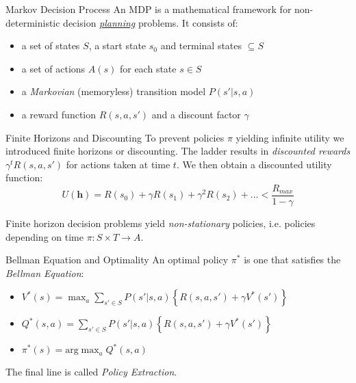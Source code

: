 \documentclass{cognito}
\begin{document}
\begin{note}{Markov Decision Process}
	An MDP is a mathematical framework for non-deterministic decision \hyperref[note:Planning vs. Learning]{\it planning} problems.
	It consists of:
	\begin{itemize}
		\item a set of states $S$, a start state $s_0$ and terminal states $\subseteq S$
		\item a set of actions $A(s)$ for each state $s \in S$
		\item a \emph{Markovian} (memoryless) transition model $P(s' | s, a)$
		\item a reward function $R(s,a,s')$ and a discount factor $\gamma$
	\end{itemize}
\end{note}

\begin{note}{Finite Horizons and Discounting}
	To prevent policies $\pi$ yielding infinite utility we introduced finite horizons or discounting.
	The ladder results in \emph{discounted rewards} $\gamma^t R(s, a, s')$ for actions taken at time $t$.
	We then obtain a discounted utility function:
	$$
		U(\mathbf{h}) = R(s_0) + \gamma R(s_1) + \gamma^2 R(s_2) + ... < \frac{R_{max}}{1 - \gamma}
	$$
	\begin{remark}
		Finite horizon decision problems yield \emph{non-stationary} policies, i.e.
		policies depending on time $\pi : S \times T \to A$.
	\end{remark}
	\vspace{-5pt}
\end{note}

\begin{note}{Bellman Equation and Optimality}
	An optimal policy $\pi^*$ is one that satisfies the \emph{Bellman Equation}:
	\begin{itemize}
		\item $V^*(s) = \max_a  \sum_{s' \in S} P(s' | s, a) \left\{ R(s,a,s') + \gamma V^*(s') \right\}$
		\item $Q^*(s, a) = \sum_{s' \in S} P(s' | s, a) \left\{ R(s,a,s') + \gamma V^*(s') \right\}$
		\item $\pi^*(s) = \text{arg}\max_a Q^*(s, a)$
	\end{itemize}
	\begin{remark} The final line is called \emph{Policy Extraction}. \end{remark}
	\vspace{-5pt}
\end{note}
\end{document}
